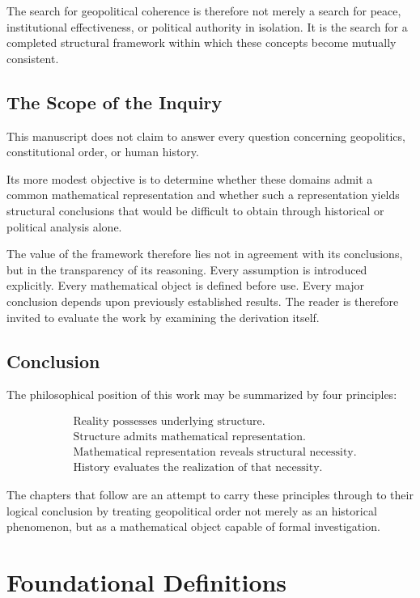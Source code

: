 \documentclass[11pt,openany]{book}
\theoremstyle{plain}
\theoremstyle{definition}
\begin{document}
The search for geopolitical coherence is therefore not merely a search for peace, institutional effectiveness, or political authority in isolation. It is the search for a completed structural framework within which these concepts become mutually consistent.

\section*{The Scope of the Inquiry}

This manuscript does not claim to answer every question concerning geopolitics, constitutional order, or human history.

Its more modest objective is to determine whether these domains admit a common mathematical representation and whether such a representation yields structural conclusions that would be difficult to obtain through historical or political analysis alone.

The value of the framework therefore lies not in agreement with its conclusions, but in the transparency of its reasoning. Every assumption is introduced explicitly. Every mathematical object is defined before use. Every major conclusion depends upon previously established results. The reader is therefore invited to evaluate the work by examining the derivation itself.

\section*{Conclusion}

The philosophical position of this work may be summarized by four principles:

\[
\boxed{
\begin{aligned}
&\text{Reality possesses underlying structure.}\\[0.3em]
&\text{Structure admits mathematical representation.}\\[0.3em]
&\text{Mathematical representation reveals structural necessity.}\\[0.3em]
&\text{History evaluates the realization of that necessity.}
\end{aligned}
}
\]

The chapters that follow are an attempt to carry these principles through to their logical conclusion by treating geopolitical order not merely as an historical phenomenon, but as a mathematical object capable of formal investigation.
\chapter*{Foundational Definitions}
\end{document}
